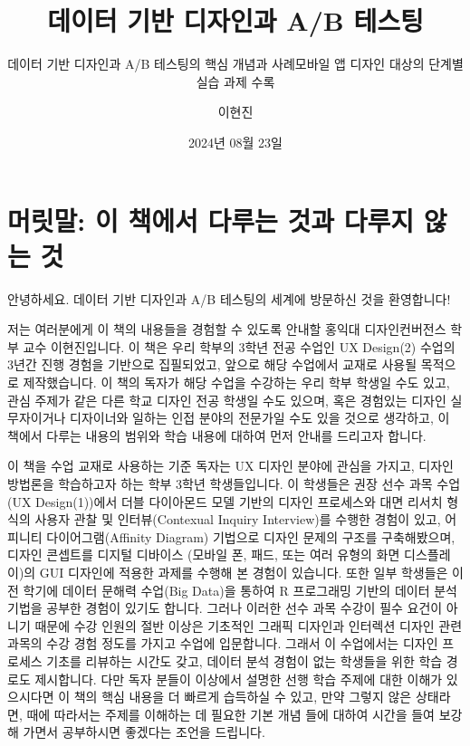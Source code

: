\documentclass[
  letterpaper,
]{book}
\title{데이터 기반 디자인과 A/B 테스팅}
\subtitle{데이터 기반 디자인과 A/B 테스팅의 핵심 개념과 사례모바일 앱
디자인 대상의 단계별 실습 과제 수록}
\author{이현진}
\date{2024년 08월 23일}
\renewcommand*\contentsname{목차}
\newcommand\contentsname{목차}
\begin{document}
\frontmatter
\maketitle

\renewcommand*\contentsname{목차}
{
\hypersetup{linkcolor=}
\setcounter{tocdepth}{2}
\tableofcontents
}

\mainmatter
{}

\chapter{머릿말: 이 책에서 다루는 것과 다루지 않는
것}\label{uxba38uxb9bfuxb9d0-uxc774-uxcc45uxc5d0uxc11c-uxb2e4uxb8e8uxb294-uxac83uxacfc-uxb2e4uxb8e8uxc9c0-uxc54auxb294-uxac83}

안녕하세요. 데이터 기반 디자인과 A/B 테스팅의 세계에 방문하신 것을
환영합니다!

저는 여러분에게 이 책의 내용들을 경험할 수 있도록 안내할 홍익대
디자인컨버전스 학부 교수 이현진입니다. 이 책은 우리 학부의 3학년 전공
수업인 UX Design(2) 수업의 3년간 진행 경험을 기반으로 집필되었고, 앞으로
해당 수업에서 교재로 사용될 목적으로 제작했습니다. 이 책의 독자가 해당
수업을 수강하는 우리 학부 학생일 수도 있고, 관심 주제가 같은 다른 학교
디자인 전공 학생일 수도 있으며, 혹은 경험있는 디자인 실무자이거나
디자이너와 일하는 인접 분야의 전문가일 수도 있을 것으로 생각하고, 이
책에서 다루는 내용의 범위와 학습 내용에 대하여 먼저 안내를 드리고자
합니다.

이 책을 수업 교재로 사용하는 기준 독자는 UX 디자인 분야에 관심을 가지고,
디자인 방법론을 학습하고자 하는 학부 3학년 학생들입니다. 이 학생들은
권장 선수 과목 수업(UX Design(1))에서 더블 다이아몬드 모델 기반의 디자인
프로세스와 대면 리서치 형식의 사용자 관찰 및 인터뷰(Contexual Inquiry
Interview)를 수행한 경험이 있고, 어피니티 다이어그램(Affinity Diagram)
기법으로 디자인 문제의 구조를 구축해봤으며, 디자인 콘셉트를 디지털
디바이스 (모바일 폰, 패드, 또는 여러 유형의 화면 디스플레이)의 GUI
디자인에 적용한 과제를 수행해 본 경험이 있습니다. 또한 일부 학생들은
이전 학기에 데이터 문해력 수업(Big Data)을 통하여 R 프로그래밍 기반의
데이터 분석 기법을 공부한 경험이 있기도 합니다. 그러나 이러한 선수 과목
수강이 필수 요건이 아니기 때문에 수강 인원의 절반 이상은 기초적인 그래픽
디자인과 인터렉션 디자인 관련 과목의 수강 경험 정도를 가지고 수업에
입문합니다. 그래서 이 수업에서는 디자인 프로세스 기초를 리뷰하는 시간도
갖고, 데이터 분석 경험이 없는 학생들을 위한 학습 경로도 제시합니다. 다만
독자 분들이 이상에서 설명한 선행 학습 주제에 대한 이해가 있으시다면 이
책의 핵심 내용을 더 빠르게 습득하실 수 있고, 만약 그렇지 않은 상태라면,
때에 따라서는 주제를 이해하는 데 필요한 기본 개념 들에 대하여 시간을
들여 보강해 가면서 공부하시면 좋겠다는 조언을 드립니다.
\end{document}
